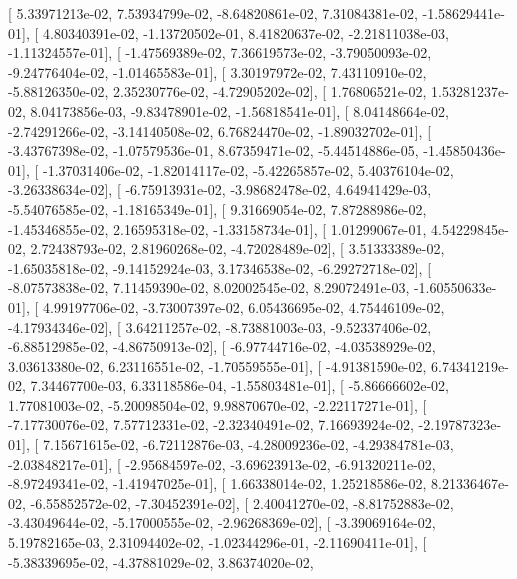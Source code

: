 \documentclass{article}
\begin{document}
       [  5.33971213e-02,   7.53934799e-02,  -8.64820861e-02,
          7.31084381e-02,  -1.58629441e-01],
       [  4.80340391e-02,  -1.13720502e-01,   8.41820637e-02,
         -2.21811038e-03,  -1.11324557e-01],
       [ -1.47569389e-02,   7.36619573e-02,  -3.79050093e-02,
         -9.24776404e-02,  -1.01465583e-01],
       [  3.30197972e-02,   7.43110910e-02,  -5.88126350e-02,
          2.35230776e-02,  -4.72905202e-02],
       [  1.76806521e-02,   1.53281237e-02,   8.04173856e-03,
         -9.83478901e-02,  -1.56818541e-01],
       [  8.04148664e-02,  -2.74291266e-02,  -3.14140508e-02,
          6.76824470e-02,  -1.89032702e-01],
       [ -3.43767398e-02,  -1.07579536e-01,   8.67359471e-02,
         -5.44514886e-05,  -1.45850436e-01],
       [ -1.37031406e-02,  -1.82014117e-02,  -5.42265857e-02,
          5.40376104e-02,  -3.26338634e-02],
       [ -6.75913931e-02,  -3.98682478e-02,   4.64941429e-03,
         -5.54076585e-02,  -1.18165349e-01],
       [  9.31669054e-02,   7.87288986e-02,  -1.45346855e-02,
          2.16595318e-02,  -1.33158734e-01],
       [  1.01299067e-01,   4.54229845e-02,   2.72438793e-02,
          2.81960268e-02,  -4.72028489e-02],
       [  3.51333389e-02,  -1.65035818e-02,  -9.14152924e-03,
          3.17346538e-02,  -6.29272718e-02],
       [ -8.07573838e-02,   7.11459390e-02,   8.02002545e-02,
          8.29072491e-03,  -1.60550633e-01],
       [  4.99197706e-02,  -3.73007397e-02,   6.05436695e-02,
          4.75446109e-02,  -4.17934346e-02],
       [  3.64211257e-02,  -8.73881003e-03,  -9.52337406e-02,
         -6.88512985e-02,  -4.86750913e-02],
       [ -6.97744716e-02,  -4.03538929e-02,   3.03613380e-02,
          6.23116551e-02,  -1.70559555e-01],
       [ -4.91381590e-02,   6.74341219e-02,   7.34467700e-03,
          6.33118586e-04,  -1.55803481e-01],
       [ -5.86666602e-02,   1.77081003e-02,  -5.20098504e-02,
          9.98870670e-02,  -2.22117271e-01],
       [ -7.17730076e-02,   7.57712331e-02,  -2.32340491e-02,
          7.16693924e-02,  -2.19787323e-01],
       [  7.15671615e-02,  -6.72112876e-03,  -4.28009236e-02,
         -4.29384781e-03,  -2.03848217e-01],
       [ -2.95684597e-02,  -3.69623913e-02,  -6.91320211e-02,
         -8.97249341e-02,  -1.41947025e-01],
       [  1.66338014e-02,   1.25218586e-02,   8.21336467e-02,
         -6.55852572e-02,  -7.30452391e-02],
       [  2.40041270e-02,  -8.81752883e-02,  -3.43049644e-02,
         -5.17000555e-02,  -2.96268369e-02],
       [ -3.39069164e-02,   5.19782165e-03,   2.31094402e-02,
         -1.02344296e-01,  -2.11690411e-01],
       [ -5.38339695e-02,  -4.37881029e-02,   3.86374020e-02,
\end{document}
